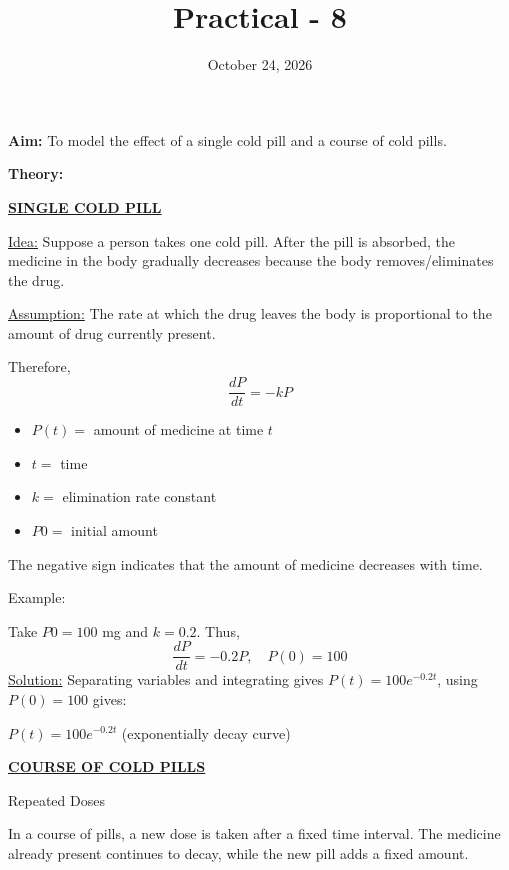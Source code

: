 \documentclass{article}
\title{\textbf{Practical - 8}}
\author{}
\date{October 24, 2026}
\begin{document}
\maketitle

\noindent
\textbf{\large{Aim:}} To model the effect of a single cold pill and a course of cold pills.

\vspace{1em}
\noindent
\textbf{\large{Theory:}}

\begin{center}
    \textbf{\underline{SINGLE COLD PILL}}
\end{center}

\noindent
\underline{Idea:} Suppose a person takes one cold pill. After the pill is absorbed, the medicine in the body gradually decreases because the body removes/eliminates the drug.

\noindent
\underline{Assumption:} The rate at which the drug leaves the body is proportional to the amount of drug currently present.

\noindent
Therefore,
\[\frac{dP}{dt} = - kP\]
\begin{itemize}
    \item $P(t) =$ amount of medicine at time $t$
    \item $t =$ time
    \item $k =$ elimination rate constant
    \item $P0 =$ initial amount
\end{itemize}
The negative sign indicates that the amount of medicine decreases with time.

\noindent
Example:

Take $P0 = 100$ mg and $k = 0.2$. Thus,
\[\frac{dP}{dt} = -0.2P, \quad P(0) = 100\]
\underline{Solution:} Separating variables and integrating gives $P(t) = 100e^{-0.2t}$, using $P(0) = 100$ gives:
\begin{center}$P(t) = 100e^{-0.2t}$ (exponentially decay curve)\end{center}

\vspace{2em}
\begin{center}
    \textbf{\underline{COURSE OF COLD PILLS}}
\end{center}

\noindent
Repeated Doses

\noindent
In a course of pills, a new dose is taken after a fixed time interval. The medicine already present continues to decay, while the new pill adds a fixed amount.
\end{document}
